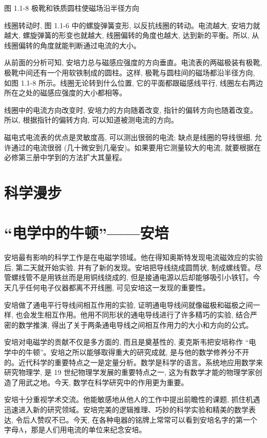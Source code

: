 \documentclass[10pt]{article}
\begin{document}
图 1.1-8 极靴和铁质圆柱使磁场沿半径方向

线圈转动时, 图 1.1-6 中的螺旋弹簧变形, 以反抗线圈的转动。电流越大, 安培力就越大, 螺旋弹簧的形变也就越大, 线圈偏转的角度也越大, 达到新的平衡。所以, 从线圈偏转的角度就能判断通过电流的大小。

从前面的分析可知, 安培力总与磁感应强度的方向垂直。电流表的两磁极装有极靴, 极靴中间还有一个用软铁制成的圆柱。这样, 极靴与圆柱间的磁场都沿半径方向, 如图 1.1-8 所示。线圈无论转到什么位置, 它的平面都跟磁感线平行, 线圈左右两边所在之处的磁感应强度的大小都相等。

线圈中的电流方向改变时, 安培力的方向随着改变, 指针的偏转方向也随着改变。所以, 根据指针的偏转方向, 可以知道被测电流的方向。

磁电式电流表的优点是灵敏度高, 可以测出很弱的电流; 缺点是线圈的导线很细, 允许通过的电流很弱 (几十微安到几毫安)。如果要用它测量较大的电流, 就要根据在必修第三册中学到的方法扩大其量程。

\section*{科学漫步}

\section*{“电学中的牛顿”——安培}

安培最有影响的科学工作是在电磁学领域。他在得知奥斯特发现电流磁效应的实验后, 第二天就开始实验, 并有了新的发现。安培把导线绕成圆筒状, 制成螺线管。尽管螺线管不是用铁丝而是用铜线绕成的, 但是接通电源以后却能够吸引小铁钉。今天几乎任何电子仪器都离不开线圈, 可见安培这一发现的重要性。

安培做了通电平行导线间相互作用的实验, 证明通电导线间就像磁极和磁极之间一样, 也会发生相互作用。他用不同形状的通电导线进行了许多精巧的实验, 结合严密的数学推演, 得出了关于两条通电导线之间相互作用力的大小和方向的公式。

安培对电磁学的贡献不仅是多方面的, 而且是奠基性的, 麦克斯韦把安培称作 “电学中的牛顿”。安培之所以能够取得重大的研究成就, 是与他的数学修养分不开的。近代科学的重要特点之一是定量分析。数学是科学的语言。系统地应用数学来研究物理学, 是 19 世纪物理学发展的重要特点之一, 这为有数学才能的物理学家创造了用武之地。今天, 数学在科学研究中的作用更为重要。

安培十分重视学术交流。他能敏感地从他人的工作中提出前瞻性的课题, 抓住机遇迅速进入新的研究领域。安培完美的逻辑推理、巧妙的科学实验和精美的数学表达, 令后人赞叹不已。今天, 在各种电器的铭牌上常常可以看到安培名字的第一个字母A，那是人们用电流的单位来纪念安培。
\end{document}
